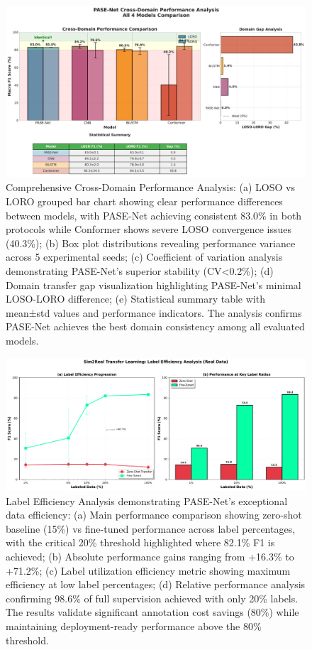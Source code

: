 \documentclass[lettersize,journal]{IEEEtran}
\begin{document}
\begin{figure}[t]
\centering
\includegraphics[width=\linewidth]{plots/fig4_cross_domain.pdf}
\caption{Comprehensive Cross-Domain Performance Analysis: (a) LOSO vs LORO grouped bar chart showing clear performance differences between models, with PASE-Net achieving consistent 83.0\% in both protocols while Conformer shows severe LOSO convergence issues (40.3\%); (b) Box plot distributions revealing performance variance across 5 experimental seeds; (c) Coefficient of variation analysis demonstrating PASE-Net's superior stability (CV<0.2\%); (d) Domain transfer gap visualization highlighting PASE-Net's minimal LOSO-LORO difference; (e) Statistical summary table with mean±std values and performance indicators. The analysis confirms PASE-Net achieves the best domain consistency among all evaluated models.}
\label{fig:cross_domain}
\end{figure}

\begin{figure}[t]
\centering
\includegraphics[width=\linewidth]{plots/fig5_label_efficiency.pdf}
\caption{Label Efficiency Analysis demonstrating PASE-Net's exceptional data efficiency: (a) Main performance comparison showing zero-shot baseline (15\%) vs fine-tuned performance across label percentages, with the critical 20\% threshold highlighted where 82.1\% F1 is achieved; (b) Absolute performance gains ranging from +16.3\% to +71.2\%; (c) Label utilization efficiency metric showing maximum efficiency at low label percentages; (d) Relative performance analysis confirming 98.6\% of full supervision achieved with only 20\% labels. The results validate significant annotation cost savings (80\%) while maintaining deployment-ready performance above the 80\% threshold.}
\label{fig:label_efficiency}
\end{figure}
\end{document}
